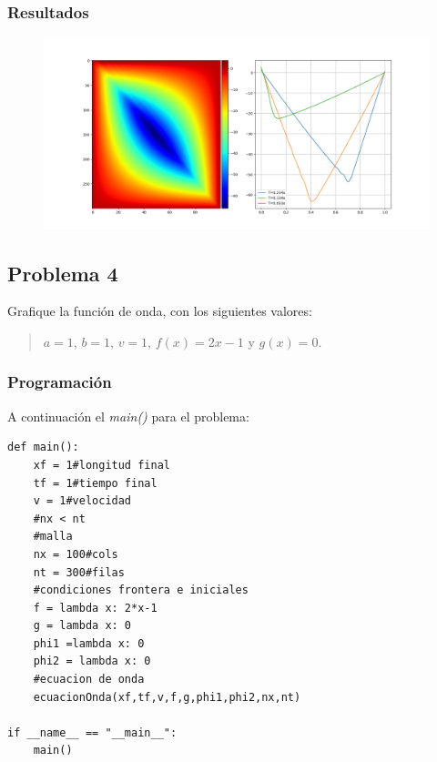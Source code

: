 \documentclass[a4paper,12pt]{article}
\newcommand{\eq}[1]{$#1$}
\begin{document}
    \subsubsection{Resultados}
    \begin{figure}[h]
        \centering
        \includegraphics[width=\textwidth]{graph3.png}
    \end{figure}

    \subsection{Problema 4}
    Grafique la función de onda, con los siguientes valores:
    \begin{quote}
        \centering
        \eq{a = 1}, \eq{b = 1}, \eq{v = 1}, \eq{f(x) = 2x - 1} y \eq{g(x) = 0}.
    \end{quote}
    \subsubsection{Programación}
    A continuación el \emph{main()} para el problema:

\begin{lstlisting}[frame=single]
    def main():
    xf = 1#longitud final
    tf = 1#tiempo final
    v = 1#velocidad 
    #nx < nt
    #malla
    nx = 100#cols
    nt = 300#filas
    #condiciones frontera e iniciales
    f = lambda x: 2*x-1
    g = lambda x: 0
    phi1 =lambda x: 0
    phi2 = lambda x: 0
    #ecuacion de onda
    ecuacionOnda(xf,tf,v,f,g,phi1,phi2,nx,nt)

if __name__ == "__main__":
    main()
\end{lstlisting}
\end{document}
